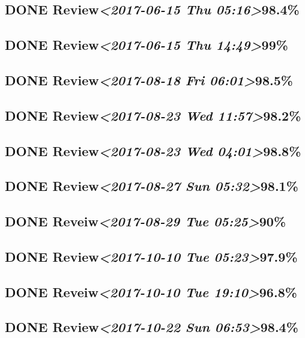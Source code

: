 \documentclass[11pt]{ctexart}
\begin{document}
\subsection{{\bfseries\sffamily DONE} Review\textit{<2017-06-15 Thu 05:16>}98.4\%}
\label{sec:orgb8d83f9}
\subsection{{\bfseries\sffamily DONE} Review\textit{<2017-06-15 Thu 14:49>}99\%}
\label{sec:org8443598}
\subsection{{\bfseries\sffamily DONE} Review\textit{<2017-08-18 Fri 06:01>}98.5\%}
\label{sec:orgfec00b0}
\subsection{{\bfseries\sffamily DONE} Review\textit{<2017-08-23 Wed 11:57>}98.2\%}
\label{sec:org4677d35}
\subsection{{\bfseries\sffamily DONE} Review\textit{<2017-08-23 Wed 04:01>}98.8\%}
\label{sec:orgee238c3}
\subsection{{\bfseries\sffamily DONE} Review\textit{<2017-08-27 Sun 05:32>}98.1\%}
\label{sec:org17ae7fc}
\subsection{{\bfseries\sffamily DONE} Reveiw\textit{<2017-08-29 Tue 05:25>}90\%}
\label{sec:org1d7da26}

\subsection{{\bfseries\sffamily DONE} Review\textit{<2017-10-10 Tue 05:23>}97.9\%}
\label{sec:orgdd06dc0}
\subsection{{\bfseries\sffamily DONE} Reveiw\textit{<2017-10-10 Tue 19:10>}96.8\%}
\label{sec:org3aa804f}
\subsection{{\bfseries\sffamily DONE} Review\textit{<2017-10-22 Sun 06:53>}98.4\%}
\label{sec:orgae372e4}
\end{document}
